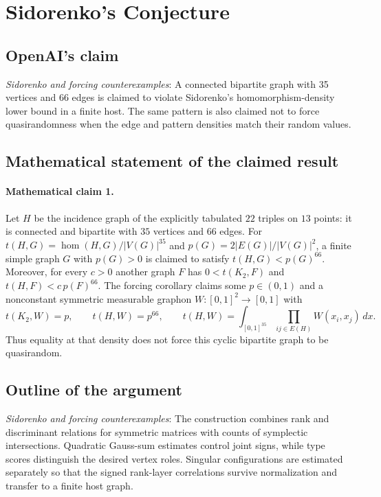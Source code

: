 \documentclass[11pt]{article}
\begin{document}
\section*{Sidorenko's Conjecture}

\subsection{OpenAI's claim}
\textit{Sidorenko and forcing counterexamples}: A connected bipartite graph with 35 vertices and 66 edges is claimed to violate Sidorenko’s homomorphism-density lower bound in a finite host. The same pattern is also claimed not to force quasirandomness when the edge and pattern densities match their random values.

\subsection{Mathematical statement of the claimed result}
\paragraph{Mathematical claim 1.} Let $H$ be the incidence graph of the explicitly tabulated $22$ triples on $13$ points: it is connected and bipartite with $35$ vertices and $66$ edges. For $t(H,G)=\operatorname{hom}(H,G)/|V(G)|^{35}$ and $p(G)=2|E(G)|/|V(G)|^2$, a finite simple graph $G$ with $p(G)>0$ is claimed to satisfy $t(H,G)<p(G)^{66}$. Moreover, for every $c>0$ another graph $F$ has $0<t(K_2,F)$ and $t(H,F)<c\,p(F)^{66}$. The forcing corollary claims some $p\in(0,1)$ and a nonconstant symmetric measurable graphon $W:[0,1]^2\to[0,1]$ with \[t(K_2,W)=p,\qquad t(H,W)=p^{66},\qquad t(H,W)=\int_{[0,1]^{35}}\prod_{ij\in E(H)}W(x_i,x_j)\,dx.\] Thus equality at that density does not force this cyclic bipartite graph to be quasirandom.

\subsection{Outline of the argument}
\textit{Sidorenko and forcing counterexamples}: The construction combines rank and discriminant relations for symmetric matrices with counts of symplectic intersections. Quadratic Gauss-sum estimates control joint signs, while type scores distinguish the desired vertex roles. Singular configurations are estimated separately so that the signed rank-layer correlations survive normalization and transfer to a finite host graph.
\end{document}
